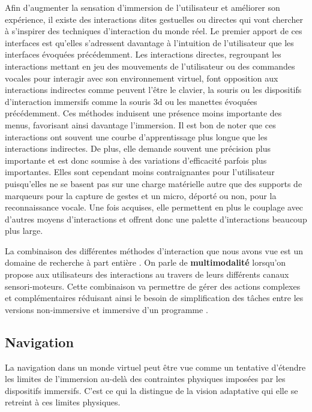 Afin d'augmenter la sensation d'immersion de l'utilisateur et améliorer son expérience, il existe des interactions dites gestuelles ou directes qui vont chercher à s'inspirer des techniques d'interaction du monde réel. Le premier apport de ces interfaces est qu'elles s'adressent davantage à l'intuition de l'utilisateur que les interfaces évoquées précédemment.
Les interactions directes, regroupant les interactions mettant en jeu des mouvements de l'utilisateur ou des commandes vocales pour interagir avec son environnement virtuel, font opposition aux interactions indirectes comme peuvent l'être le clavier, la souris ou les dispositifs d'interaction immersifs comme la souris 3d ou les manettes évoquées précédemment. Ces méthodes induisent une présence moins importante des menus, favorisant ainsi davantage l'immersion. Il est bon de noter que ces interactions ont souvent une courbe d'apprentissage plus longue que les interactions indirectes. De plus, elle demande souvent une précision plus importante et est donc soumise à des variations d'efficacité parfois plus importantes. Elles sont cependant moins contraignantes pour l'utilisateur puisqu'elles ne se basent pas sur une charge matérielle autre que des supports de marqueurs pour la capture de gestes et un micro, déporté ou non, pour la reconnaissance vocale. Une fois acquises, elle permettent en plus le couplage avec d'autres moyens d'interactions et offrent donc une palette d'interactions beaucoup plus large.

La combinaison des différentes méthodes d'interaction que nous avons vue est un domaine de recherche à part entière \cite{martin_hardware_2014,martin_reconfigurable_2011}. On parle de \textbf{multimodalité} lorsqu'on propose aux utilisateurs des interactions au travers de leurs différents canaux sensori-moteurs. Cette combinaison va permettre de gérer des actions complexes et complémentaires réduisant ainsi le besoin de simplification des tâches entre les versions non-immersive et immersive d'un programme \cite{bossard2005gestural}.



\subsection{Navigation} \label{navigation}

La navigation dans un monde virtuel peut être vue comme un tentative d'étendre les limites de l'immersion au-delà des contraintes physiques imposées par les dispositifs immersifs. C'est ce qui la distingue de la vision adaptative qui elle se retreint à ces limites physiques. 

